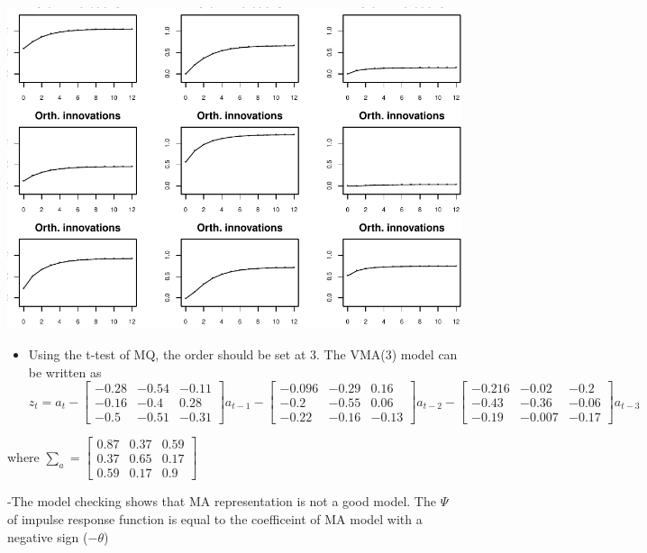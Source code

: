 \documentclass[]{article}
\providecommand{\tightlist}{%
  \setlength{\itemsep}{0pt}\setlength{\parskip}{0pt}}
\begin{document}
\includegraphics{HW3_files/figure-latex/unnamed-chunk-7-2.pdf}

\begin{itemize}
\tightlist
\item
  Using the t-test of MQ, the order should be set at 3. The VMA(3) model
  can be written as
  \(z_{t} = a_{t} - \left[\begin{array}{ccc}-0.28 & -0.54 & -0.11 \\ -0.16 & -0.4 & 0.28 \\ -0.5 & -0.51 & -0.31\end{array}\right]a_{t-1} - \left[\begin{array}{rrr}-0.096 & -0.29 & 0.16 \\-0.2 & -0.55 & 0.06 \\-0.22 & -0.16 & -0.13\end{array}\right]a_{t-2} - \left[\begin{array}{rrr}-0.216 & -0.02 & -0.2 \\-0.43 & -0.36 & -0.06 \\-0.19 & -0.007 & -0.17\end{array}\right]a_{t-3}\)
\end{itemize}

where
\(\sum_{a} = \left[\begin{array}{rrr}0.87 & 0.37 & 0.59\\0.37 & 0.65 & 0.17 \\ 0.59 & 0.17 & 0.9\end{array}\right]\)

-The model checking shows that MA representation is not a good model.
The \(\Psi\) of impulse response function is equal to the coefficeint of
MA model with a negative sign (\(-\theta\))
\end{document}

